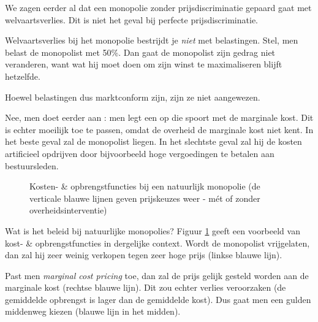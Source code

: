 We zagen eerder al dat een monopolie zonder prijsdiscriminatie gepaard gaat met welvaartsverlies. Dit is niet het geval bij perfecte prijsdiscriminatie.\\

\par Welvaartsverlies bij het monopolie bestrijdt je \textit{niet} met belastingen. Stel, men belast de monopolist met 50\%. Dan gaat de monopolist zijn gedrag niet veranderen, want wat hij moet doen om zijn winst te maximaliseren blijft hetzelfde.
\par Hoewel belastingen dus marktconform zijn, zijn ze niet aangewezen.\\

\par Nee, men doet eerder aan  : men legt een  op die spoort met de marginale kost. Dit is echter moeilijk toe te passen, omdat de overheid de marginale kost niet kent. In het beste geval zal de monopolist liegen. In het slechtste geval zal hij de kosten artificieel opdrijven door bijvoorbeeld hoge vergoedingen te betalen aan bestuursleden.\\

\begin{figure}[H]
\vspace{0.5cm}
\centering
\captionsetup{justification=centering,margin=2cm}
\caption{Kosten- \& opbrengstfuncties bij een natuurlijk monopolie (de verticale blauwe lijnen geven prijskeuzes weer - m\'et of zonder overheidsinterventie)}
\label{fig:h3natmon2}
\end{figure}

Wat is het beleid bij natuurlijke monopolies? Figuur \ref{fig:h3natmon2} geeft een voorbeeld van kost- \& opbrengstfuncties in dergelijke context. Wordt de monopolist vrijgelaten, dan zal hij zeer weinig verkopen tegen zeer hoge prijs (linkse blauwe lijn).
\par Past men \textit{marginal cost pricing} toe, dan zal de prijs gelijk gesteld worden aan de marginale kost (rechtse blauwe lijn). Dit zou echter verlies veroorzaken (de gemiddelde opbrengst is lager dan de gemiddelde kost). Dus gaat men een gulden middenweg kiezen (blauwe lijn in het midden).\\


